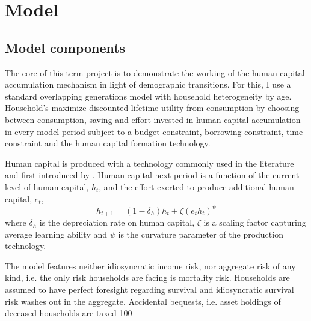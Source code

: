 \section{Model}
\label{sec:model}

\subsection{Model components}

The core of this term project is to demonstrate the working of the human capital accumulation mechanism in light of demographic transitions. For this, I use a standard overlapping generations model with household heterogeneity by age. Household's maximize discounted lifetime utility from consumption by choosing between consumption, saving and effort invested in human capital accumulation in every model period subject to a budget constraint, borrowing constraint, time constraint and the human capital formation technology.

Human capital is produced with a technology commonly used in the literature and first introduced by \cite{Ben-Porath1967}. Human capital next period is a function of the current level of human capital, $h_t$, and the effort exerted to produce additional human capital, $e_t$,
$$ h_{t+1} = (1-\delta_h) h_t + \zeta (e_t h_t)^\psi$$
where $\delta_h$ is the depreciation rate on human capital, $\zeta$ is a scaling factor capturing average learning ability and $\psi$ is the curvature parameter of the production technology.

The model features neither idiosyncratic income risk, nor aggregate risk of any kind, i.e. the only risk households are facing is mortality risk. Households are assumed to have perfect foresight regarding survival and idiosyncratic survival risk washes out in the aggregate. Accidental bequests, i.e. asset holdings of deceased households are taxed 100%

